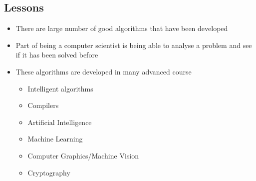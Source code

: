\begin{slide}
\section[-1.5]{Lessons}

\begin{PauseHighLight}
  \begin{itemize}
  \item There are large number of good algorithms that have been
    developed\pause
  \item Part of being a computer scientist is being able to analyse a
    problem and see if it has been solved before\pause
  \item These algorithms are developed in many advanced course
    \begin{itemize}\squeeze
    \item Intelligent algorithms
    \item Compilers
    \item Artificial Intelligence
    \item Machine Learning
    \item Computer Graphics/Machine Vision
    \item Cryptography\pause
    \end{itemize}
  \end{itemize}
\end{PauseHighLight}

\end{slide}

